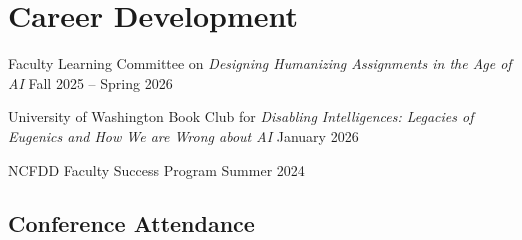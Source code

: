 
\section*{{} Career Development}

\begin{cventries}

    \begin{cvreviews}
    \cvreview
    {Faculty Learning Committee on \textit{Designing Humanizing Assignments in the Age of AI}} %
    {Fall 2025 -- Spring 2026} %
    \end{cvreviews}

    \begin{cvreviews}
    \cvreview
    {University of Washington Book Club for \textit{Disabling Intelligences: Legacies of Eugenics and How We are Wrong about AI}} %
    {January 2026} %
    \end{cvreviews}
    
    \begin{cvreviews}
    \cvreview
    {NCFDD Faculty Success Program} %
    {Summer 2024} %
    \end{cvreviews}
\end{cventries}

\vspace{10pt}
\subsection*{Conference Attendance}

\begin{cventries}
%
{%
    \begin{cvreviews}
    \cvreview
    {\projectname} %
    {\date} %
    \end{cvreviews}
}
\end{cventries}